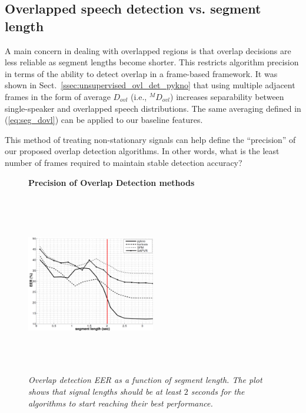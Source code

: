 {%


\newpage
\subsection{Overlapped speech detection vs. segment length}
\label{sssec:ovl_frame_vs_seg}

A main concern in dealing with overlapped regions is that overlap decisions are less reliable as segment lengths become shorter. 
This restricts algorithm precision in terms of the ability to detect overlap in a frame-based framework. 
It was shown in Sect.~\ref{ssec:unsupervised_ovl_det_pykno} that using multiple adjacent frames in the form of average $D_{ovl}$ (i.e., $^MD_{ovl}$) increases separability between single-speaker and overlapped speech distributions. 
The same averaging defined in (\ref{eq:seg_dovl}) can be applied to our baseline features. 

This method of treating non-stationary signals can help define the ``precision'' of our proposed overlap detection algorithms. 
In other words, what is the least number of frames required to maintain stable detection accuracy? 

\begin{figure}[h!]
	\centering
	\hspace{-1mm}
	\textbf{Precision of Overlap Detection methods}\par\medskip
	\includegraphics[height = 3.1in, width=0.5\textwidth]{figures/eer_vs_time}
	\vspace{-1mm}
	\caption{\it Overlap detection EER as a function of segment length. The plot shows that signal lengths should be at least $2$ seconds for the algorithms to start reaching their best performance.}
	\vspace{0mm}
	\label{fig:ovl_det_precision}
\end{figure}


}
